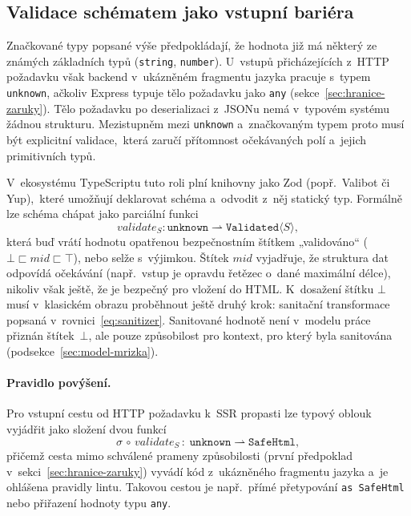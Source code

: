 \subsection{Validace schématem jako vstupní bariéra}
\label{sec:schema-validace}

Značkované typy popsané výše předpokládají, že hodnota již má některý ze známých základních typů (\texttt{string}, \texttt{number}). U~vstupů přicházejících z~HTTP požadavku však backend v~ukázněném fragmentu jazyka pracuje s~typem \texttt{unknown}, ačkoliv Express typuje tělo požadavku jako \texttt{any} (sekce~\ref{sec:hranice-zaruky}). Tělo požadavku po deserializaci z~JSONu nemá v~typovém systému žádnou strukturu. Mezistupněm mezi \texttt{unknown} a~značkovaným typem proto musí být explicitní validace,~která zaručí přítomnost očekávaných polí a~jejich primitivních typů.

V~ekosystému TypeScriptu tuto roli plní knihovny jako Zod (popř.~Valibot či Yup),~které umožňují deklarovat schéma a~odvodit z~něj statický typ. Formálně lze schéma chápat jako parciální funkci
\begin{equation}
    \mathit{validate}_S : \mathtt{unknown} \rightharpoonup \mathtt{Validated}\langle S \rangle,
    \label{eq:validate}
\end{equation}
která buď vrátí hodnotu opatřenou bezpečnostním štítkem „validováno“ ($\bot \sqsubset \mathit{mid} \sqsubset \top$), nebo selže s~výjimkou. Štítek $\mathit{mid}$ vyjadřuje, že struktura dat odpovídá očekávání (např.~vstup je opravdu řetězec o~dané maximální délce), nikoliv však ještě, že je bezpečný pro vložení do HTML. K~dosažení štítku $\bot$ musí v~klasickém obrazu proběhnout ještě druhý krok: sanitační transformace popsaná v~rovnici~\ref{eq:sanitizer}. Sanitované hodnotě není v~modelu práce přiznán štítek~$\bot$, ale pouze způsobilost pro kontext, pro který byla sanitována (podsekce~\ref{sec:model-mrizka}).

\paragraph{Pravidlo povýšení.}
Pro vstupní cestu od HTTP požadavku k~SSR propasti lze typový oblouk vyjádřit jako složení dvou funkcí
\begin{equation}
    \sigma \,\circ\, \mathit{validate}_S \,:\; \mathtt{unknown} \rightharpoonup \mathtt{SafeHtml},
    \label{eq:pipeline}
\end{equation}
přičemž cesta mimo schválené prameny způsobilosti (první předpoklad v~sekci~\ref{sec:hranice-zaruky}) vyvádí kód z~ukázněného fragmentu jazyka a~je ohlášena pravidly lintu. Takovou cestou je např.~přímé přetypování \texttt{as SafeHtml} nebo přiřazení hodnoty typu \texttt{any}.

